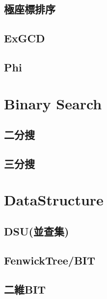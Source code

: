\documentclass[a4paper,10pt,twocolumn,oneside]{article}
\begin{document}
  \subsection{極座標排序}
  

  \subsection{ExGCD}
  

  \subsection{Phi}
  



\section{Binary Search}
    \subsection{二分搜}
    

    \subsection{三分搜}
    


\section{DataStructure}
    \subsection{DSU(並查集)}
    
    
    \subsection{FenwickTree/BIT}
    

    \subsection{二維BIT}
    
\end{document}
